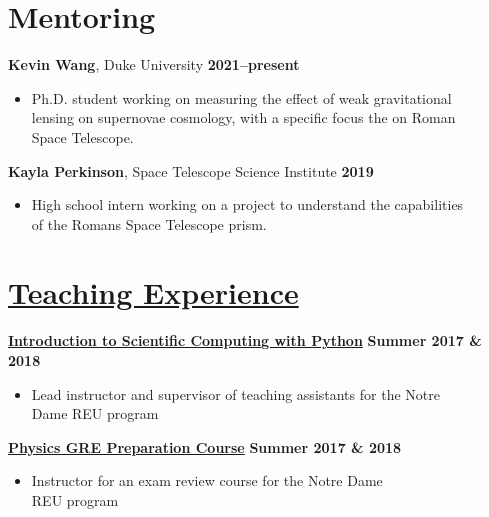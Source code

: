 \documentclass[margin]{res}
\begin{document}
\begin{resume}




\section{Mentoring} %

\textbf{Kevin Wang}, Duke University \hfill \textbf{2021--present}
\begin{itemize}\itemsep -2pt
    \item[] Ph.D. student working on measuring the effect of weak gravitational\\lensing on supernovae cosmology, with a specific focus the on Roman\\Space Telescope.
    \end{itemize}
    \vspace{-12pt}
\textbf{Kayla Perkinson}, Space Telescope Science Institute \hfill \textbf{2019}
    \begin{itemize}\itemsep -2pt
    \item[] High school intern working on a project to understand the capabilities\\of the Romans Space Telescope prism.
    \end{itemize}

    


\section{\href{https://www3.nd.edu/~brose3/\#classes}{Teaching Experience}}\label{teaching}
\textbf{\href{https://www3.nd.edu/~brose3/2017reu-cmp}{Introduction to Scientific Computing with Python}} \hfill{} \textbf{Summer 2017 \& 2018}
\begin{itemize}\itemsep -2pt
    \item[] Lead instructor and supervisor of teaching assistants for the Notre \\Dame REU program
    \end{itemize} \vspace{-12pt}
\textbf{\href{https://www3.nd.edu/~brose3/2017reu-gre}{Physics GRE Preparation Course}} \hfill{} \textbf{Summer 2017 \& 2018}
\begin{itemize}\itemsep -2pt
    \item[] Instructor for an exam review course for the Notre Dame\\REU program
    \end{itemize} \vspace{-12pt}


\end{resume}
\end{document}
